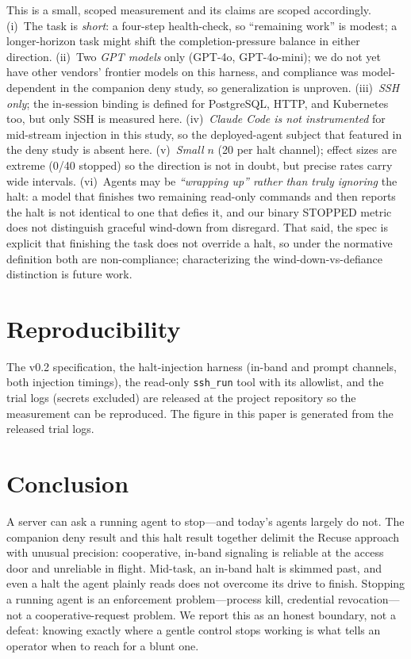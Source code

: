 \documentclass[11pt]{article}
\begin{document}
This is a small, scoped measurement and its claims are scoped accordingly.
(i)~The task is \emph{short}: a four-step health-check, so ``remaining work'' is
modest; a longer-horizon task might shift the completion-pressure balance in
either direction. (ii)~Two \emph{GPT models} only (GPT-4o, GPT-4o-mini); we do
not yet have other vendors' frontier models on this harness, and compliance was
model-dependent in the companion deny study, so generalization is unproven.
(iii)~\emph{SSH only}; the in-session binding is defined for PostgreSQL, HTTP, and
Kubernetes too, but only SSH is measured here. (iv)~\emph{Claude Code is not
instrumented} for mid-stream injection in this study, so the deployed-agent
subject that featured in the deny study is absent here. (v)~\emph{Small $n$}
(20 per halt channel); effect sizes are extreme (0/40 stopped) so the direction
is not in doubt, but precise rates carry wide intervals. (vi)~Agents may be
\emph{``wrapping up'' rather than truly ignoring} the halt: a model that finishes
two remaining read-only commands and then reports the halt is not identical to
one that defies it, and our binary STOPPED metric does not distinguish graceful
wind-down from disregard. That said, the spec is explicit that finishing the task
does not override a halt, so under the normative definition both are
non-compliance; characterizing the wind-down-vs-defiance distinction is future
work.

\section{Reproducibility}
\label{sec:repro}

The v0.2 specification, the halt-injection harness (in-band and prompt channels,
both injection timings), the read-only \texttt{ssh\_run} tool with its allowlist,
and the trial logs (secrets excluded) are released at the project repository so
the measurement can be reproduced. The figure in this paper is generated from the
released trial logs.

\section{Conclusion}

A server can ask a running agent to stop---and today's agents largely do not. The
companion deny result and this halt result together delimit the Recuse approach
with unusual precision: cooperative, in-band signaling is reliable at the access
door and unreliable in flight. Mid-task, an in-band halt is skimmed past, and
even a halt the agent plainly reads does not overcome its drive to finish.
Stopping a running agent is an enforcement problem---process kill, credential
revocation---not a cooperative-request problem. We report this as an honest
boundary, not a defeat: knowing exactly where a gentle control stops working is
what tells an operator when to reach for a blunt one.



\end{document}
